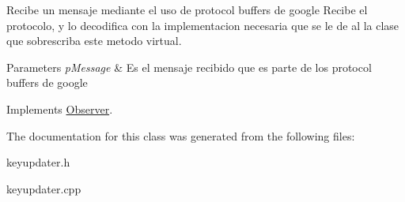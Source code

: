 Recibe un mensaje mediante el uso de protocol buffers de google Recibe el protocolo, y lo decodifica con la implementacion necesaria que se le de al la clase que sobrescriba este metodo virtual. 


\begin{DoxyParams}{Parameters}
{\em p\-Message} & Es el mensaje recibido que es parte de los protocol buffers de google \\
\hline
\end{DoxyParams}


Implements \hyperlink{class_observer_a7204fd48ae9f9c2f39ea7e165740c451}{Observer}.



The documentation for this class was generated from the following files\-:\begin{DoxyCompactItemize}
\item 
keyupdater.\-h\item 
keyupdater.\-cpp\end{DoxyCompactItemize}

